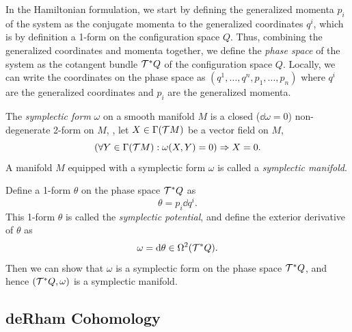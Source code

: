 In the Hamiltonian formulation, we start by defining the generalized momenta \(p_i\) of the system as the conjugate momenta to the generalized coordinates \(q^i\), which is by definition a 1-form on the configuration space \(Q\). Thus, combining the generalized coordinates and momenta together, we define the \emph{phase space} of the system as the cotangent bundle \(\mathcal T^* Q\) of the configuration space \(Q\). Locally, we can write the coordinates on the phase space as \((q^1, \ldots, q^n, p_1, \ldots, p_n)\) where \(q^i\) are the generalized coordinates and \(p_i\) are the generalized momenta.
\begin{definition}
    The \emph{symplectic form} \(\omega\) on a smooth manifold \(M\) is a closed (\(\dd \omega = 0\)) non-degenerate 2-form on \(M\), \ie, let \(X \in \Gamma(\mathcal T M)\) be a vector field on \(M\),
    \begin{equation*}
        (\forall Y \in \Gamma(\mathcal T M): \omega(X, Y) = 0) \Rightarrow X = 0.
    \end{equation*}
    A manifold \(M\) equipped with a symplectic form \(\omega\) is called a \emph{symplectic manifold}.
\end{definition}
Define a 1-form \(\theta\) on the phase space \(\mathcal T^* Q\) as
\begin{equation*}
    \theta = p_i \dd{q^i}.
\end{equation*}
This 1-form \(\theta\) is called the \emph{symplectic potential}, and define the exterior derivative of \(\theta\) as
\begin{equation*}
    \omega = \dd{\theta} \in \Omega^2(\mathcal T^* Q).
\end{equation*}
Then we can show that \(\omega\) is a symplectic form on the phase space \(\mathcal T^* Q\), and hence \((\mathcal T^* Q, \omega)\) is a symplectic manifold.

\subsection{deRham Cohomology}

